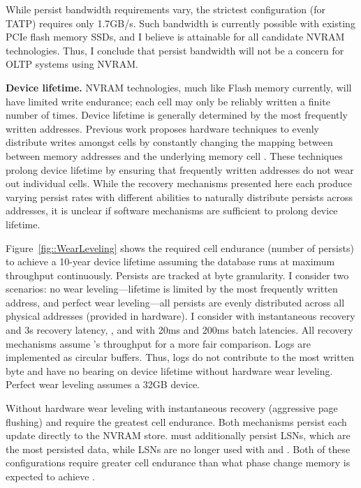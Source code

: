 While persist bandwidth requirements vary, the strictest configuration (\NVDisk for TATP) requires only 1.7GB/s.
Such bandwidth is currently possible with existing PCIe flash memory SSDs, and I believe is attainable for all candidate NVRAM technologies.
Thus, I conclude that persist bandwidth will not be a concern for OLTP systems using NVRAM.

\textbf{Device lifetime.}
NVRAM technologies, much like Flash memory currently, will have limited write endurance; each cell may only be reliably written a finite number of times.
Device lifetime is generally determined by the most frequently written addresses.
Previous work proposes hardware techniques to evenly distribute writes amongst cells by constantly changing the mapping between between memory addresses and the underlying memory cell \cite{QureshiKaridis09}.
These techniques prolong device lifetime by ensuring that frequently written addresses do not wear out individual cells.
While the recovery mechanisms presented here each produce varying persist rates with different abilities to naturally distribute persists across addresses, it is unclear if software mechanisms are sufficient to prolong device lifetime.


Figure~\ref{fig::WearLeveling} shows the required cell endurance (number of persists) to achieve a 10-year device lifetime assuming the database runs at maximum throughput continuously.
Persists are tracked at byte granularity.
I consider two scenarios: no wear leveling---lifetime is limited by the most frequently written address, and perfect wear leveling---all persists are evenly distributed across all physical addresses (provided in hardware).
I consider \NVDisk with instantaneous recovery and 3s recovery latency, \InPlace, and \GroupCommit with 20ms and 200ms batch latencies.
All recovery mechanisms assume \InPlace's throughput for a more fair comparison.
Logs are implemented as circular buffers.
Thus, logs do not contribute to the most written byte and have no bearing on device lifetime without hardware wear leveling.
Perfect wear leveling assumes a 32GB device.

Without hardware wear leveling \NVDisk with instantaneous recovery (aggressive page flushing) and \InPlace require the greatest cell endurance.
Both mechanisms persist each update directly to the NVRAM store.
\NVDisk must additionally persist LSNs, which are the most persisted data, while LSNs are no longer used with \InPlace and \GroupCommit.
Both of these configurations require greater cell endurance than what phase change memory is expected to achieve .

